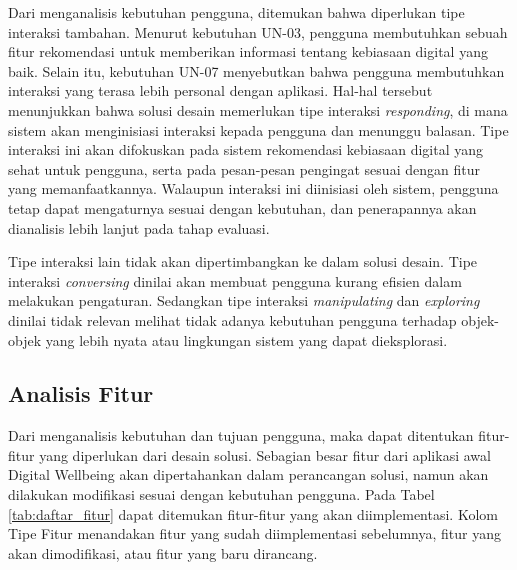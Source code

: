 Dari menganalisis kebutuhan pengguna, ditemukan bahwa diperlukan tipe interaksi tambahan. Menurut kebutuhan UN-03, pengguna membutuhkan sebuah fitur rekomendasi untuk memberikan informasi tentang kebiasaan digital yang baik. Selain itu, kebutuhan UN-07 menyebutkan bahwa pengguna membutuhkan interaksi yang terasa lebih personal dengan aplikasi. Hal-hal tersebut menunjukkan bahwa solusi desain memerlukan tipe interaksi \textit{responding}, di mana sistem akan menginisiasi interaksi kepada pengguna dan menunggu balasan. Tipe interaksi ini akan difokuskan pada sistem rekomendasi kebiasaan digital yang sehat untuk pengguna, serta pada pesan-pesan pengingat sesuai dengan fitur yang memanfaatkannya. Walaupun interaksi ini diinisiasi oleh sistem, pengguna tetap dapat mengaturnya sesuai dengan kebutuhan, dan penerapannya akan dianalisis lebih lanjut pada tahap evaluasi.

Tipe interaksi lain tidak akan dipertimbangkan ke dalam solusi desain. Tipe interaksi \textit{conversing} dinilai akan membuat pengguna kurang efisien dalam melakukan pengaturan. Sedangkan tipe interaksi \textit{manipulating} dan \textit{exploring} dinilai tidak relevan melihat tidak adanya kebutuhan pengguna terhadap objek-objek yang lebih nyata atau lingkungan sistem yang dapat dieksplorasi.


\subsection{Analisis Fitur}
\label{subsec:analisis_fitur}

Dari menganalisis kebutuhan dan tujuan pengguna, maka dapat ditentukan fitur-fitur yang diperlukan dari desain solusi. Sebagian besar fitur dari aplikasi awal Digital Wellbeing akan dipertahankan dalam perancangan solusi, namun akan dilakukan modifikasi sesuai dengan kebutuhan pengguna. Pada Tabel \ref{tab:daftar_fitur} dapat ditemukan fitur-fitur yang akan diimplementasi. Kolom Tipe Fitur menandakan fitur yang sudah diimplementasi sebelumnya, fitur yang akan dimodifikasi, atau fitur yang baru dirancang. 


